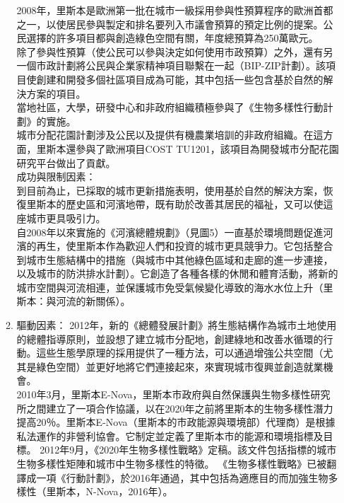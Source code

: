 \documentclass[a4paper,12pt]{article}
\begin{document}
\begin{enumerate}
\begin{enumerate}
2008年，里斯本是歐洲第一批在城市一級採用參與性預算程序的歐洲首都之一，以使居民參與製定和排名要列入市議會預算的預定比例的提案。公民選擇的許多項目都與創造綠色空間有關，年度總預算為250萬歐元。\\

除了參與性預算（使公民可以參與決定如何使用市政預算）之外，還有另一個市政計劃將公民與企業家精神項目聯繫在一起（BIP-ZIP計劃）。該項目使創建和開發多個社區項目成為可能，其中包括一些包含基於自然的解決方案的項目。\\

當地社區，大學，研發中心和非政府組織積極參與了《生物多樣性行動計劃》的實施。\\

城市分配花園計劃涉及公民以及提供有機農業培訓的非政府組織。在這方面，里斯本還參與了歐洲項目COST TU1201，該項目為開發城市分配花園研究平台做出了貢獻。\\
成功與限制因素：\\

到目前為止，已採取的城市更新措施表明，使用基於自然的解決方案，恢復里斯本的歷史區和河濱地帶，既有助於改善其居民的福祉，又可以使這座城市更具吸引力。\\

自2008年以來實施的《河濱總體規劃》（見圖5）一直基於環境問題促進河濱的再生，使里斯本作為歡迎人們和投資的城市更具競爭力。它包括整合到城市生態結構中的措施（與城市中其他綠色區域和走廊的進一步連接，以及城市的防洪排水計劃）。它創造了各種各樣的休閒和體育活動，將新的城市空間與河流相連，並保護城市免受氣候變化導致的海水水位上升（里斯本：與河流的新關係）。\\
\item 驅動因素：
\label{sec:orgb16558f}
2012年，新的《總體發展計劃》將生態結構作為城市土地使用的總體指導原則，並設想了建立城市分配地，創建綠地和改善水循環的行動。這些生態學原理的採用提供了一種方法，可以通過增強公共空間（尤其是綠色空間）並更好地將它們連接起來，來實現城市復興並創造就業機會。\\

2010年3月，里斯本E-Nova，里斯本市政府與自然保護與生物多樣性研究所之間建立了一項合作協議，以在2020年之前將里斯本的生物多樣性潛力提高20％。里斯本E-Nova（里斯本的市政能源與環境部）代理商）是根據私法運作的非營利協會。它制定並定義了里斯本市的能源和環境指標及目標。 2012年9月，《2020年生物多樣性戰略》定稿。該文件包括指標的城市生物多樣性矩陣和城市中生物多樣性的特徵。 《生物多樣性戰略》已被翻譯成一項《行動計劃》，於2016年通過，其中包括為適應目的而加強生物多樣性（里斯本，N-Nova，2016年）。\\


\end{enumerate}
\end{enumerate}
\end{document}
